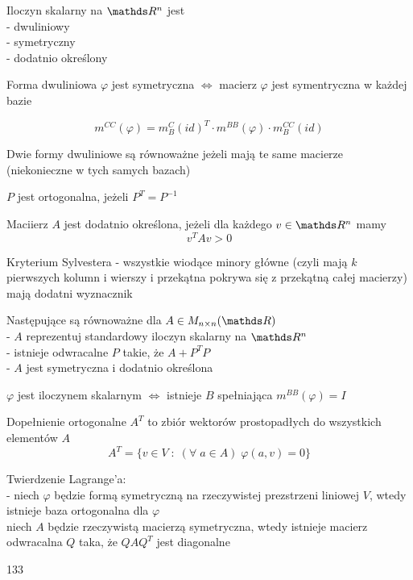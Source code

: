 \documentclass{article}
\begin{document}
\begin{multicols*}{2}
    {\color{def}Iloczyn skalarny na $\R^n$} jest\smallskip\\
    \indent - dwuliniowy\\
    \indent - symetryczny\\
    \indent - dodatnio określony\bigskip

    Forma dwuliniowa $\varphi$ jest symetryczna $\iff$ macierz $\varphi$ jest symentryczna w każdej bazie

    $$m^{CC}(\varphi)=m^C_B(id)^T\cdot m^{BB}(\varphi)\cdot m^{CC}_B(id)$$

    Dwie formy dwuliniowe są {\color{def}równoważne} jeżeli mają te same macierze (niekonieczne w tych samych bazach)


    $P$ jest {\color{def}ortogonalna}, jeżeli $P^T=P^{-1}$\bigskip

    Maciierz $A$ jest {\color{def}dodatnio określona}, jeżeli dla każdego $v\in \R^n$ mamy
    $$v^TAv>0$$

    {\color{def}Kryterium Sylvestera} - wszystkie {\color{def}wiodące minory główne} (czyli mają $k$ pierwszych kolumn i wierszy i przekątna pokrywa się z przekątną całej macierzy) mają dodatni wyznacznik

    Następujące są równoważne dla $A\in M_{n\times n}(\R)$\smallskip\\
    \indent - $A$ reprezentuj standardowy iloczyn skalarny na $\R^n$\\
    \indent - istnieje odwracalne $P$ takie, że $A+P^TP$\\
    \indent - $A$ jest symetryczna i dodatnio określona\bigskip

    $\varphi$ jest iloczynem skalarnym $\iff$ istnieje $B$ spełniająca $m^{BB}(\varphi)=I$


    {\color{def}Dopełnienie ortogonalne $A^T$} to zbiór wektorów prostopadłych do wszystkich elementów $A$
    $$A^T=\{v\in V\;:\;(\forall\;a\in A)\;\varphi(a, v)=0\}$$

    {\color{def}Twierdzenie Lagrange'a}:\smallskip\\
    \indent - niech $\varphi$ będzie formą symetryczną na rzeczywistej prezstrzeni liniowej $V$, wtedy istnieje baza ortogonalna dla $\varphi$\\
    \indent niech $A$ będzie rzeczywistą macierzą symetryczna, wtedy istnieje macierz odwracalna $Q$ taka, że $QAQ^T$ jest diagonalne

    133

\end{multicols*}
\end{document}
